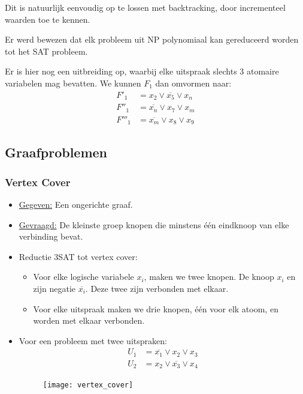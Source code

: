 \documentclass{report}
\begin{document}
Dit is natuurlijk eenvoudig op te lossen met backtracking, door incrementeel waarden toe te kennen.

Er werd bewezen dat elk probleem uit NP polynomiaal kan gereduceerd worden tot het SAT probleem. 

Er is hier nog een uitbreiding op, waarbij elke uitspraak slechts 3 atomaire variabelen mag bevatten. We kunnen $F_1$ dan omvormen naar:
\begin{equation*}
	\begin{split}
		F'_1  & = x_2 \vee \overline{x_5} \vee x_n \\
		F''_1  & = \overline{x_n} \vee x_7 \vee x_m \\
		F'''_1 & = \overline{x_m} \vee x_8 \vee x_9
	\end{split}
\end{equation*}

\subsection{Graafproblemen}
\subsubsection{Vertex Cover}
\begin{itemize}
	\item[\info] \underline{Gegeven:} Een ongerichte graaf.
	\item[\info] \underline{Gevraagd:} De kleinste groep knopen die minstens één eindknoop van elke verbinding bevat.
	\item[\info] Reductie 3SAT tot vertex cover:
	\begin{itemize}
		\item Voor elke logische variabele $x_i$, maken we twee knopen. De knoop $x_i$ en zijn negatie $\overline{x_i}$. Deze twee zijn verbonden met elkaar.
		\item Voor elke uitspraak maken we drie knopen, één voor elk atoom, en worden met elkaar verbonden.
	\end{itemize}
	\item[\info] Voor een probleem met twee uitspraken:
	\begin{equation*}
		\begin{split}
			U_1 & = \overline{x_1} \vee x_2 \vee x_3 \\
			U_2 & = x_2 \vee \overline{x_3} \vee x_4
		\end{split}
	\end{equation*}
	\begin{figure}[ht]
		\centering
		\texttt{[image: vertex\_cover]}
	\end{figure}

\end{itemize}
\end{document}
